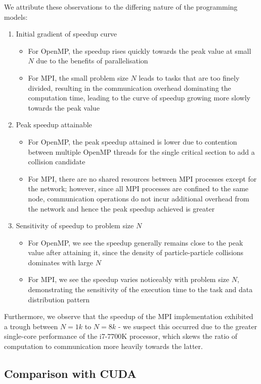 \documentclass[12pt]{article}
\begin{document}
We attribute these observations to the differing nature of the programming models:
\begin{enumerate}[label=(\arabic*)]
\item Initial gradient of speedup curve
\begin{itemize}
    \item For OpenMP, the speedup rises quickly towards the peak value at small $N$ due to the benefits of parallelisation
    \item For MPI, the small problem size $N$ leads to tasks that are too finely divided, resulting in the communication overhead dominating the computation time, leading to the curve of speedup growing more slowly towards the peak value
\end{itemize}
\item Peak speedup attainable
\begin{itemize}
    \item For OpenMP, the peak speedup attained is lower due to contention between multiple OpenMP threads for the single critical section to add a collision candidate
    \item For MPI, there are no shared resources between MPI processes except for the network; however, since all MPI processes are confined to the same node, communication operations do not incur additional overhead from the network and hence the peak speedup achieved is greater
\end{itemize}
\item Sensitivity of speedup to problem size $N$
\begin{itemize}
    \item For OpenMP, we see the speedup generally remains close to the peak value after attaining it, since the density of particle-particle collisions dominates with large $N$
    \item For MPI, we see the speedup varies noticeably with problem size $N$, demonstrating the sensitivity of the execution time to the task and data distribution pattern
\end{itemize}
\end{enumerate}

Furthermore, we observe that the speedup of the MPI implementation exhibited a trough between $N = 1k$ to $N = 8k$ - we suspect this occurred due to the greater single-core performance of the i7-7700K processor, which skews the ratio of computation to communication more heavily towards the latter.

\subsection{Comparison with CUDA}
\end{document}
